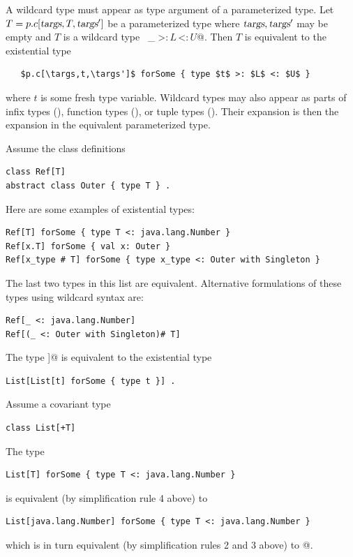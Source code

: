 A wildcard type must appear as type argument of a parameterized type.
Let $T = p.c[\mbox{\sl targs},T,\mbox{\sl targs}']$ be a parameterized type where $\mbox{\sl targs}, \mbox{\sl targs}'$ may be empty and
$T$ is a wildcard type ~\lstinline@_$\;$>:$\,L\,$<:$\,U$@. Then $T$ is equivalent to the existential
type 
\begin{lstlisting}
   $p.c[\targs,t,\targs']$ forSome { type $t$ >: $L$ <: $U$ }
\end{lstlisting}
where $t$ is some fresh type variable. 
Wildcard types may also appear as parts of infix types
(), function types (),
or tuple types ().
Their expansion is then the expansion in the equivalent parameterized
type.

\example Assume the class definitions
\begin{lstlisting}
class Ref[T]
abstract class Outer { type T } .
\end{lstlisting}
Here are some examples of existential types:
\begin{lstlisting}
Ref[T] forSome { type T <: java.lang.Number }
Ref[x.T] forSome { val x: Outer }
Ref[x_type # T] forSome { type x_type <: Outer with Singleton }
\end{lstlisting}
The last two types in this list are equivalent.
Alternative formulations of these types using wildcard syntax are:
\begin{lstlisting}
Ref[_ <: java.lang.Number]
Ref[(_ <: Outer with Singleton)# T]
\end{lstlisting}

\example The type \lstinline@List[List[_]]@ is equivalent to the existential type
\begin{lstlisting}
List[List[t] forSome { type t }] . 
\end{lstlisting}

\example Assume a covariant type
\begin{lstlisting}
class List[+T]
\end{lstlisting}
The type
\begin{lstlisting}
List[T] forSome { type T <: java.lang.Number }
\end{lstlisting}
is equivalent (by simplification rule 4 above) to
\begin{lstlisting}
List[java.lang.Number] forSome { type T <: java.lang.Number }
\end{lstlisting}
which is in turn equivalent (by simplification rules 2 and 3 above) to
@.

